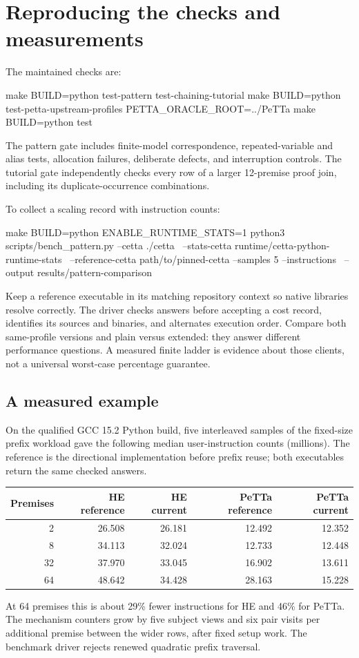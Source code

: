 \documentclass[11pt,a4paper]{article}
\begin{document}
{{{{{{{{{{{{{{\section{Reproducing the checks and measurements}\label{app:repro}

The maintained checks are:
\begin{code}
make BUILD=python test-pattern test-chaining-tutorial
make BUILD=python test-petta-upstream-profiles PETTA_ORACLE_ROOT=../PeTTa
make BUILD=python test
\end{code}
The pattern gate includes finite-model correspondence, repeated-variable and
alias tests, allocation failures, deliberate defects, and interruption
controls. The tutorial gate independently checks every row of a larger
12-premise proof join, including its duplicate-occurrence combinations.

To collect a scaling record with instruction counts:
\begin{code}
make BUILD=python ENABLE_RUNTIME_STATS=1
python3 scripts/bench_pattern.py --cetta ./cetta \
  --stats-cetta runtime/cetta-python-runtime-stats \
  --reference-cetta path/to/pinned-cetta --samples 5 --instructions \
  --output results/pattern-comparison
\end{code}
Keep a reference executable in its matching repository context so native
libraries resolve correctly. The driver checks answers before accepting a
cost record, identifies its sources and binaries, and alternates execution
order. Compare both same-profile versions and plain versus extended: they
answer different performance questions. A measured finite ladder is evidence
about those clients, not a universal worst-case percentage guarantee.

\subsection{A measured example}
On the qualified GCC 15.2 Python build, five interleaved samples of the
fixed-size prefix workload gave the following median user-instruction counts
(millions). The reference is the directional implementation before prefix reuse;
both executables return the same checked answers.
\begin{center}
\begin{tabular}{rrrrr}
\toprule
Premises & HE reference & HE current & PeTTa reference & PeTTa current\\\midrule
2 & 26.508 & 26.181 & 12.492 & 12.352\\
8 & 34.113 & 32.024 & 12.733 & 12.448\\
32 & 37.970 & 33.045 & 16.902 & 13.611\\
64 & 48.642 & 34.428 & 28.163 & 15.228\\\bottomrule
\end{tabular}
\end{center}
At 64 premises this is about 29\% fewer instructions for HE and 46\% for
PeTTa. The mechanism counters grow by five subject views and six pair visits
per additional premise between the wider rows, after fixed setup work.
The benchmark driver rejects renewed quadratic prefix traversal.

}}}}}}}}}}}}}}
\end{document}
